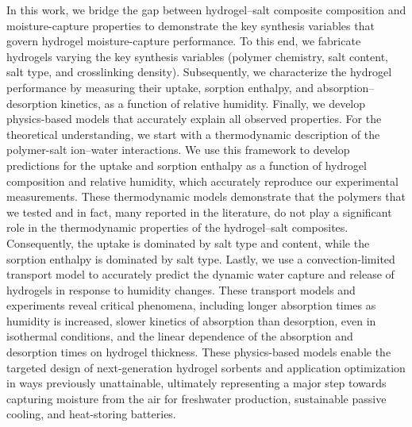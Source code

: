 \documentclass[11pt]{article}
\begin{document}
In this work, we bridge the gap between hydrogel--salt composite composition and moisture-capture properties to demonstrate the key synthesis variables that govern hydrogel moisture-capture performance. To this end, we fabricate hydrogels varying the key synthesis variables (polymer chemistry, salt content, salt type, and crosslinking density). Subsequently, we characterize the hydrogel performance by measuring their uptake, sorption enthalpy, and absorption--desorption kinetics, as a function of relative humidity. Finally, we develop physics-based models that accurately explain all observed properties. For the theoretical understanding, we start with a thermodynamic description of the polymer-salt ion--water interactions. We use this framework to develop predictions for the uptake and sorption enthalpy as a function of hydrogel composition and relative humidity, which accurately reproduce our experimental measurements. These thermodynamic models demonstrate that the polymers that we tested and in fact, many reported in the literature, do not play a significant role in the thermodynamic properties of the hydrogel--salt composites. Consequently, the uptake is dominated by salt type and content, while the sorption enthalpy is dominated by salt type. Lastly, we use a convection-limited transport model to accurately predict the dynamic water capture and release of hydrogels in response to humidity changes. These transport models and experiments reveal critical phenomena, including longer absorption times as humidity is increased, slower kinetics of absorption than desorption, even in isothermal conditions, and the linear dependence of the absorption and desorption times on hydrogel thickness. These physics-based models enable the targeted design of next-generation hydrogel sorbents and application optimization in ways previously unattainable, ultimately representing a major step towards capturing moisture from the air for freshwater production, sustainable passive cooling, and heat-storing batteries.
\end{document}
